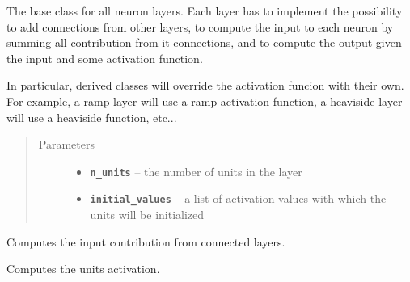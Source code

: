 \documentclass[letterpaper,10pt,english]{sphinxmanual}
\begin{document}
\begin{fulllineitems}
\label{simpleNNlib_docs:simpleNNlib.AbstractNNLayer}
The base class for all neuron layers. Each layer has to implement the possibility to
add connections from other layers,
to compute the input to each neuron by summing all contribution from it connections,
and to compute the output given the input and some activation function.

In particular, derived classes will override the activation funcion with their own.
For example, a ramp layer will use a ramp activation function,
a heaviside layer will use a heaviside function, etc...
\begin{quote}\begin{description}
\item[{Parameters}] \leavevmode\begin{itemize}
\item {} 
\textbf{\texttt{n\_units}} -- the number of units in the layer

\item {} 
\textbf{\texttt{initial\_values}} -- a list of activation values with which the units will be 
initialized

\end{itemize}

\end{description}\end{quote}

\begin{fulllineitems}
\label{simpleNNlib_docs:simpleNNlib.AbstractNNLayer.sum_input}
Computes the input contribution from connected layers.

\end{fulllineitems}


\begin{fulllineitems}
\label{simpleNNlib_docs:simpleNNlib.AbstractNNLayer.activate}
Computes the units activation.

\end{fulllineitems}


\end{fulllineitems}
\end{document}
